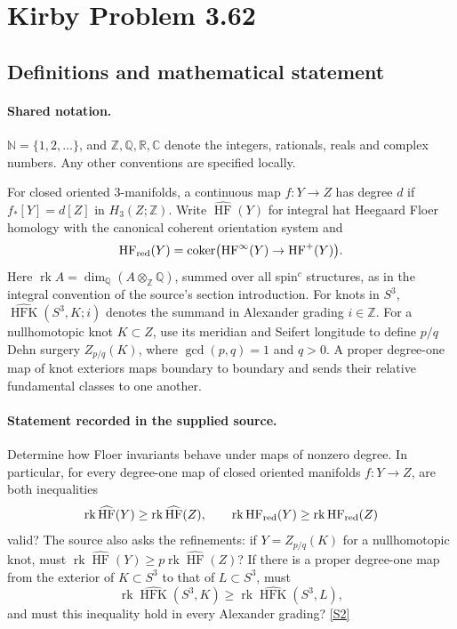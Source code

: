 \documentclass[11pt]{article}
\newcommand{\sref}[2]{\hyperlink{source:#1:#2}{[S#2]}}
\begin{document}
\section{Kirby Problem 3.62}\label{statement}

\subsection{Definitions and mathematical statement}

\paragraph{Shared notation.}$\mathbb N=\{1,2,\ldots\}$, and $\mathbb Z,\mathbb Q,\mathbb R,\mathbb C$ denote the integers, rationals, reals and complex numbers. Any other conventions are specified locally.


For closed oriented $3$-manifolds, a continuous map $f:Y\to Z$ has degree $d$ if $f_*[Y]=d[Z]$ in $H_3(Z;\mathbb Z)$. Write $\widehat{\operatorname{HF}}(Y)$ for integral hat Heegaard Floer homology with the canonical coherent orientation system and
\[
\operatorname{HF}_{\rm red}(Y)=\operatorname{coker}\bigl(\operatorname{HF}^{\infty}(Y)\to\operatorname{HF}^{+}(Y)\bigr).
\]
Here $\operatorname{rk}A=\dim_{\mathbb Q}(A\otimes_{\mathbb Z}\mathbb Q)$, summed over all spin$^c$ structures, as in the integral convention of the source's section introduction. For knots in $S^3$, $\widehat{\operatorname{HFK}}(S^3,K;i)$ denotes the summand in Alexander grading $i\in\mathbb Z$.
For a nullhomotopic knot $K\subset Z$, use its meridian and Seifert longitude to define $p/q$ Dehn surgery $Z_{p/q}(K)$, where $\gcd(p,q)=1$ and $q>0$. A proper degree-one map of knot exteriors maps boundary to boundary and sends their relative fundamental classes to one another.
\paragraph{Statement recorded in the supplied source.}
Determine how Floer invariants behave under maps of nonzero degree. In particular, for every degree-one map of closed oriented manifolds $f:Y\to Z$, are both inequalities
\[
\operatorname{rk}\widehat{\operatorname{HF}}(Y)\ge\operatorname{rk}\widehat{\operatorname{HF}}(Z),\qquad
\operatorname{rk}\operatorname{HF}_{\rm red}(Y)\ge\operatorname{rk}\operatorname{HF}_{\rm red}(Z)
\]
valid? The source also asks the refinements: if $Y=Z_{p/q}(K)$ for a nullhomotopic knot, must $\operatorname{rk}\widehat{\operatorname{HF}}(Y)\ge p\operatorname{rk}\widehat{\operatorname{HF}}(Z)$? If there is a proper degree-one map from the exterior of $K\subset S^3$ to that of $L\subset S^3$, must
\[
\operatorname{rk}\widehat{\operatorname{HFK}}(S^3,K)\ge\operatorname{rk}\widehat{\operatorname{HFK}}(S^3,L),
\]
and must this inequality hold in every Alexander grading? \sref{statement}{2}
\end{document}
